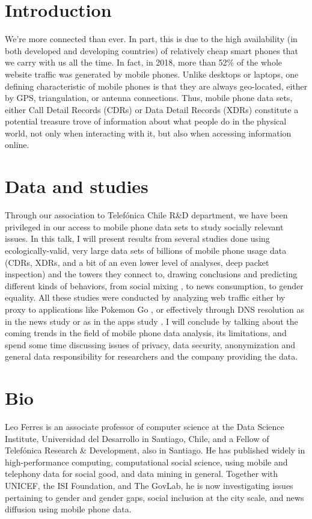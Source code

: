 \documentclass[sigconf]{acmart}
\begin{document}
\section{Introduction}
We're more connected than ever. In part, this is due to the high
availability (in both developed and developing countries) of
relatively cheap smart phones that we carry with us all the time. In
fact, in 2018, more than 52\% of the whole website traffic was
generated by mobile phones. Unlike desktops or laptops, one defining
characteristic of mobile phones is that they are always geo-located,
either by GPS, triangulation, or antenna connections. Thus, mobile
phone data sets, either Call Detail Records (CDRs) or Data Detail
Records (XDRs) constitute a potential treasure trove of
information about what people do in the physical world, not only when
interacting with it, but also when accessing information online.

\section{Data and studies}
\label{sec:findings}

Through our association to Telef\'onica Chile R\&D department, we have
been privileged in our access to mobile phone data sets to study
socially relevant issues. In this talk, I will present results from
several studies done using ecologically-valid, very large data sets of
billions of mobile phone usage data (CDRs, XDRs, and a bit of an even
lower level of analyses, deep packet inspection) and the towers they
connect to, drawing conclusions and predicting different kinds of
behaviors, from social mixing \cite{Beiro2018}, to news consumption,
to gender equality. All these studies were conducted by analyzing web
traffic either by proxy to applications like Pokemon Go
\cite{Graells-Garrido2017}, or effectively through DNS resolution as
in the news study or as in the apps study
\cite{Graells-Garrido:2018:WMA:3184558.3191561}. I will conclude by
talking about the coming trends in the field of mobile phone data
analysis, its limitations, and spend some time discussing issues of
privacy, data security, anonymization and general data responsibility
for researchers and the company providing the data.

\section{Bio}

Leo Ferres is an associate professor of computer science at the Data
Science Institute, Universidad del Desarrollo in Santiago, Chile, and
a Fellow of Telef\'onica Research \& Development, also in Santiago. He
has published widely in high-performance computing, computational
social science, using mobile and telephony data for social good, and
data mining in general. Together with UNICEF, the ISI Foundation, and
The GovLab, he is now investigating issues pertaining to gender and
gender gaps, social inclusion at the city scale, and news diffusion
using mobile phone data.
\end{document}
